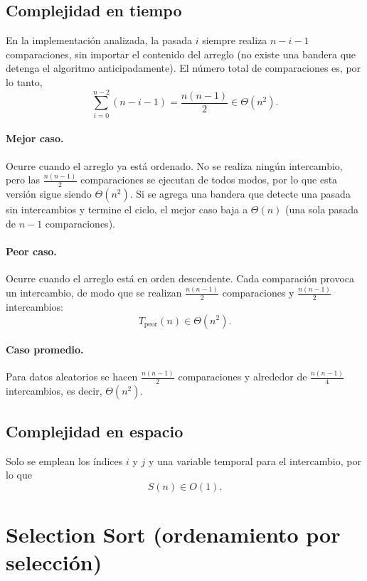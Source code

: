 \subsection{Complejidad en tiempo}

En la implementación analizada, la pasada $i$ siempre realiza $n-i-1$ comparaciones, sin importar el contenido del arreglo (no existe una bandera que detenga el algoritmo anticipadamente). El número total de comparaciones es, por lo tanto,
\[
  \sum_{i=0}^{n-2} (n-i-1) = \frac{n(n-1)}{2} \in \Theta(n^2).
\]

\paragraph{Mejor caso.} Ocurre cuando el arreglo ya está ordenado. No se realiza ningún intercambio, pero las $\frac{n(n-1)}{2}$ comparaciones se ejecutan de todos modos, por lo que esta versión sigue siendo $\Theta(n^2)$. Si se agrega una bandera que detecte una pasada sin intercambios y termine el ciclo, el mejor caso baja a $\Theta(n)$ (una sola pasada de $n-1$ comparaciones).

\paragraph{Peor caso.} Ocurre cuando el arreglo está en orden descendente. Cada comparación provoca un intercambio, de modo que se realizan $\frac{n(n-1)}{2}$ comparaciones y $\frac{n(n-1)}{2}$ intercambios:
\[
  T_{\text{peor}}(n) \in \Theta(n^2).
\]

\paragraph{Caso promedio.} Para datos aleatorios se hacen $\frac{n(n-1)}{2}$ comparaciones y alrededor de $\frac{n(n-1)}{4}$ intercambios, es decir, $\Theta(n^2)$.

\subsection{Complejidad en espacio}

Solo se emplean los índices $i$ y $j$ y una variable temporal para el intercambio, por lo que
\[
  S(n) \in O(1).
\]

\section{Selection Sort (ordenamiento por selección)}

